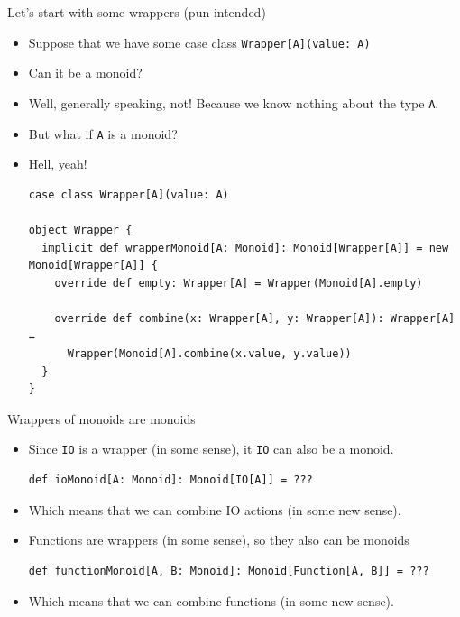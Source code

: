\documentclass[presentation,aspectratio=169,smaller]{beamer}
\begin{document}
\begin{frame}[label={sec:orge46a2f1},fragile]{Let's start with some wrappers (pun intended)}
 \begin{itemize}
\item <1-> Suppose that we have some case class \texttt{Wrapper[A](value: A)}
\item <2-> Can it be a monoid?
\item <3-> Well, generally speaking, not! Because we know nothing about the type \texttt{A}.
\item <4-> But what if \texttt{A} is a monoid?
\item <5-> Hell, yeah!
\begin{verbatim}
case class Wrapper[A](value: A)

object Wrapper {
  implicit def wrapperMonoid[A: Monoid]: Monoid[Wrapper[A]] = new Monoid[Wrapper[A]] {
    override def empty: Wrapper[A] = Wrapper(Monoid[A].empty)

    override def combine(x: Wrapper[A], y: Wrapper[A]): Wrapper[A] =
      Wrapper(Monoid[A].combine(x.value, y.value))
  }
}
\end{verbatim}
\end{itemize}
\end{frame}

\begin{frame}[label={sec:org271aeb4},fragile]{Wrappers of monoids are monoids}
 \begin{itemize}
\item <1-> Since \texttt{IO} is a wrapper (in some sense), it \texttt{IO} can also be a monoid.
\begin{verbatim}
def ioMonoid[A: Monoid]: Monoid[IO[A]] = ???
\end{verbatim}
\item <2-> Which means that we can combine IO actions (in some new sense).
\item <3-> Functions are wrappers (in some sense), so they also can be monoids
\begin{verbatim}
def functionMonoid[A, B: Monoid]: Monoid[Function[A, B]] = ???
\end{verbatim}
\item <4-> Which means that we can combine functions (in some new sense).
\end{itemize}
\end{frame}
\end{document}
